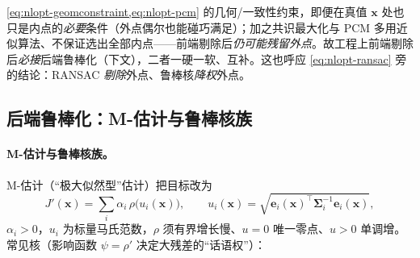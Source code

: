 \begin{insight}
\cref{eq:nlopt-geomconstraint,eq:nlopt-pcm} 的几何/一致性约束，即便在真值 $\mathbf{x}$ 处也只是内点的\emph{必要}条件（外点偶尔也能碰巧满足）；加之共识最大化与 PCM 多用近似算法、不保证选出全部内点——前端剔除后\emph{仍可能残留外点}。故工程上前端剔除后\emph{必接}后端鲁棒化（下文），二者一硬一软、互补。这也呼应 \cref{eq:nlopt-ransac} 旁的结论：RANSAC \emph{剔除}外点、鲁棒核\emph{降权}外点。
\end{insight}

\subsection{后端鲁棒化：M-估计与鲁棒核族}
\label{sec:nlopt-robust-mest}

\paragraph{M-估计与鲁棒核族。}\cite{barfoot2024state,gaoxiang2019slam14,carlone2026handbook}
M-估计（“极大似然型”估计）把目标改为
\begin{equation}
  J'(\mathbf{x})=\sum_i\alpha_i\,\rho\big(u_i(\mathbf{x})\big),\qquad u_i(\mathbf{x})=\sqrt{\mathbf{e}_i(\mathbf{x})^\top\boldsymbol{\Sigma}_i^{-1}\mathbf{e}_i(\mathbf{x})},
  \label{eq:nlopt-mestim}
\end{equation}
$\alpha_i>0$，$u_i$ 为标量马氏范数，$\rho$ 须有界增长慢、$u=0$ 唯一零点、$u>0$ 单调增。常见核（影响函数 $\psi=\rho'$ 决定大残差的“话语权”）：

